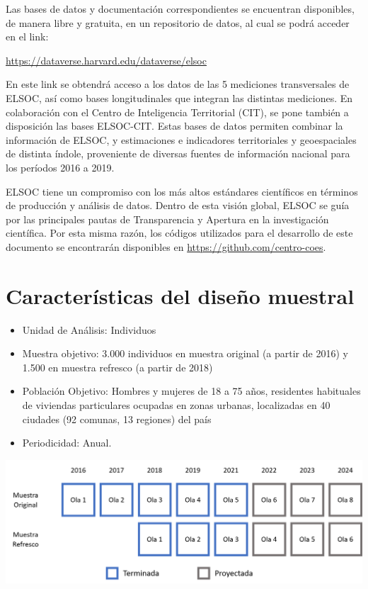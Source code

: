 \documentclass[
  12pt,
  openany]{book}
\begin{document}
Las bases de datos y documentación correspondientes se encuentran disponibles, de manera libre y gratuita, en un repositorio de datos, al cual se podrá acceder en el link:

\url{https://dataverse.harvard.edu/dataverse/elsoc}

En este link se obtendrá acceso a los datos de las 5 mediciones transversales de ELSOC, así como bases longitudinales que integran las distintas mediciones. En colaboración con el Centro de Inteligencia Territorial (CIT), se pone también a disposición las bases ELSOC-CIT. Estas bases de datos permiten combinar la información de ELSOC, y estimaciones e indicadores territoriales y geoespaciales de distinta índole, proveniente de diversas fuentes de información nacional para los períodos 2016 a 2019.

ELSOC tiene un compromiso con los más altos estándares científicos en términos de producción y análisis de datos. Dentro de esta visión global, ELSOC se guía por las principales pautas de Transparencia y Apertura en la investigación científica. Por esta misma razón, los códigos utilizados para el desarrollo de este documento se encontrarán disponibles en \url{https://github.com/centro-coes}.

\hypertarget{caracteruxedsticas-del-diseuxf1o-muestral}{%
\section{Características del diseño muestral}\label{caracteruxedsticas-del-diseuxf1o-muestral}}

\begin{itemize}
\item
  Unidad de Análisis: Individuos
\item
  Muestra objetivo: 3.000 individuos en muestra original (a partir de 2016) y 1.500 en muestra refresco (a partir de 2018)
\item
  Población Objetivo: Hombres y mujeres de 18 a 75 años, residentes habituales de viviendas particulares ocupadas en zonas urbanas, localizadas en 40 ciudades (92 comunas, 13 regiones) del país
\item
  Periodicidad: Anual.
\end{itemize}

\includegraphics[width=22.1in]{1_input/imagenes/olas_elsoc}
\end{document}
